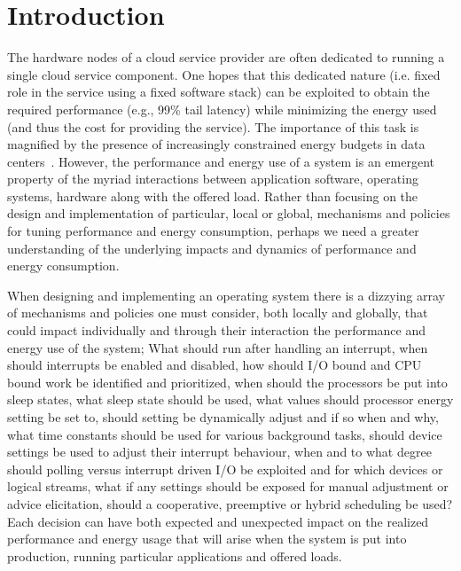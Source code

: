 \section{Introduction}

The hardware nodes of a cloud service provider are often dedicated to running a
single cloud service component.
One hopes that this dedicated nature (i.e. fixed role in the service using a
fixed software stack) can be exploited to obtain the required performance
(e.g., 99\% tail latency) while minimizing the energy used (and thus the cost
for providing the service). 
The importance of this task is magnified by the presence of increasingly
constrained energy budgets in data centers~\cite{SmoothOperator, Dynamo}. 
However, the performance and energy use of a system is an emergent property of
the myriad interactions between application software, operating systems,
hardware along with the offered load. 
Rather than focusing on the design and implementation
of  particular, local or global, mechanisms and policies for tuning performance
and energy consumption, perhaps we need a greater understanding of the
underlying impacts and dynamics of performance and energy consumption.   

When designing and implementing an operating system there is a dizzying array
of mechanisms and policies one must consider, both locally and globally, that
could impact individually and through their interaction  the performance and
energy use of the system; What should run after handling an interrupt, when
should interrupts be enabled and disabled, how should I/O bound and CPU bound
work be identified and prioritized,  when should the processors be put into
sleep states, what sleep state should be used, what values should processor
energy setting be set to, should setting be dynamically adjust and if so when
and why, what time constants should be used for various background tasks,
should device settings be used to adjust their interrupt behaviour, when and to
what degree should polling versus interrupt driven I/O be exploited and for
which devices or logical streams, what if any settings should be exposed for
manual adjustment or advice elicitation, should a cooperative, preemptive or
hybrid scheduling be used?  Each decision can have both expected and unexpected
impact on the realized performance and energy usage that will arise when the
system is put into production, running particular applications and offered
loads. 

